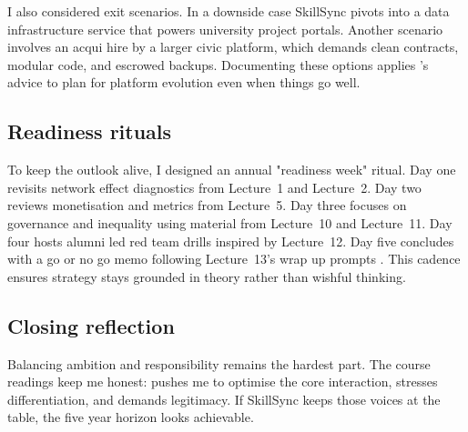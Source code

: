 I also considered exit scenarios. In a downside case SkillSync pivots into a data infrastructure service that powers university project portals. Another scenario involves an acqui hire by a larger civic platform, which demands clean contracts, modular code, and escrowed backups. Documenting these options applies \citet{Reillier2017}'s advice to plan for platform evolution even when things go well.

\subsection*{Readiness rituals}
To keep the outlook alive, I designed an annual "readiness week" ritual. Day one revisits network effect diagnostics from Lecture~1 and Lecture~2. Day two reviews monetisation and metrics from Lecture~5. Day three focuses on governance and inequality using material from Lecture~10 and Lecture~11. Day four hosts alumni led red team drills inspired by Lecture~12. Day five concludes with a go or no go memo following Lecture~13's wrap up prompts \citep{Lecture01,Lecture02,Lecture05,Lecture10,Lecture11,Lecture12,Lecture13}. This cadence ensures strategy stays grounded in theory rather than wishful thinking.

\subsection*{Closing reflection}
Balancing ambition and responsibility remains the hardest part. The course readings keep me honest: \citet{Choudary2016} pushes me to optimise the core interaction, \citet{Porter2008} stresses differentiation, and \citet{Srnicek2017} demands legitimacy. If SkillSync keeps those voices at the table, the five year horizon looks achievable.
